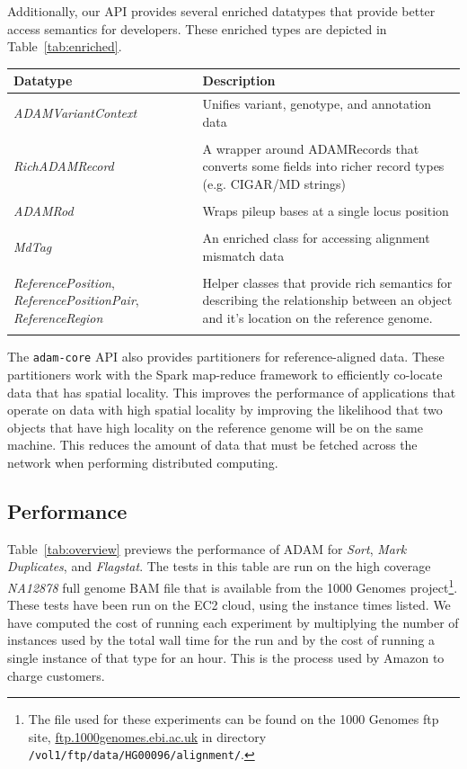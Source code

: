 \documentclass{bioinfo}
\begin{document}
Additionally, our API provides several enriched datatypes that provide better access semantics for developers. These enriched types are depicted in Table~\ref{tab:enriched}.

\begin{table}[h]
{\begin{tabular}{ p{2.5cm} p{5.5cm} }
\toprule
\bf Datatype & \bf Description \\
\midrule
\textit{ADAMVariantContext} & Unifies variant, genotype, and annotation data \\
 & \\
\textit{RichADAMRecord} & A wrapper around ADAMRecords that converts some fields into richer record types (e.g. CIGAR/MD strings) \\
 & \\
\textit{ADAMRod} & Wraps pileup bases at a single locus position \\
 & \\
\textit{MdTag} & An enriched class for accessing alignment mismatch data \\
 & \\
\textit{ReferencePosition}, \textit{ReferencePositionPair}, \textit{ReferenceRegion} & Helper classes that provide rich semantics for describing the relationship
between an object and it's location on the reference genome. \\
\botrule
\end{tabular}}{}
\end{table}

The \texttt{adam-core} API also provides partitioners for reference-aligned data. These partitioners work with the Spark map-reduce framework to efficiently co-locate data that
has spatial locality. This improves the performance of applications that operate on data with high spatial locality by improving the likelihood that two objects that have high
locality on the reference genome will be on the same machine. This reduces the amount of data that must be fetched across the network when performing distributed computing.

\subsection{Performance}
\label{sec:performance}

Table~\ref{tab:overview} previews the performance of ADAM for \textit{Sort}, \textit{Mark Duplicates}, and \textit{Flagstat}. The tests in this table are run on
the high coverage \textit{NA12878} full genome BAM file that is available from the 1000 Genomes project\footnote{The file used for these experiments can be found on the
1000 Genomes ftp site, \url{ftp.1000genomes.ebi.ac.uk} in directory \texttt{/vol1/ftp/data/HG00096/alignment/}.}. These tests have been run on the EC2 cloud, using the instance
times listed. We have computed the cost of running each experiment by multiplying the number of instances used by the total wall time for the run and by the cost of running
a single instance of that type for an hour. This is the process used by Amazon to charge customers.
\end{document}
